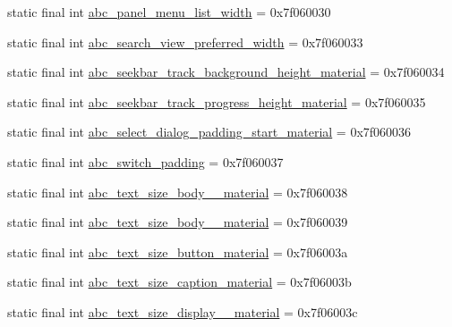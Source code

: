 \begin{DoxyCompactItemize}
\item 
static final int \mbox{\hyperlink{classcom_1_1google_1_1android_1_1gms_1_1R_1_1dimen_add7bc4ed82e03c4d01b5cb1295a62ae3}{abc\+\_\+panel\+\_\+menu\+\_\+list\+\_\+width}} = 0x7f060030
\item 
static final int \mbox{\hyperlink{classcom_1_1google_1_1android_1_1gms_1_1R_1_1dimen_acbe8579e8f0e1d5d3d8af15fb079e602}{abc\+\_\+search\+\_\+view\+\_\+preferred\+\_\+width}} = 0x7f060033
\item 
static final int \mbox{\hyperlink{classcom_1_1google_1_1android_1_1gms_1_1R_1_1dimen_a3303b3c397c279614a917fea7c881886}{abc\+\_\+seekbar\+\_\+track\+\_\+background\+\_\+height\+\_\+material}} = 0x7f060034
\item 
static final int \mbox{\hyperlink{classcom_1_1google_1_1android_1_1gms_1_1R_1_1dimen_a54b704e3923a1fb77a1e9bc92dc427e6}{abc\+\_\+seekbar\+\_\+track\+\_\+progress\+\_\+height\+\_\+material}} = 0x7f060035
\item 
static final int \mbox{\hyperlink{classcom_1_1google_1_1android_1_1gms_1_1R_1_1dimen_a3092cfc041ac0bd7f8f01a56dc8b2beb}{abc\+\_\+select\+\_\+dialog\+\_\+padding\+\_\+start\+\_\+material}} = 0x7f060036
\item 
static final int \mbox{\hyperlink{classcom_1_1google_1_1android_1_1gms_1_1R_1_1dimen_a88ea94c64aeafbb99864c2e1488ade8e}{abc\+\_\+switch\+\_\+padding}} = 0x7f060037
\item 
static final int \mbox{\hyperlink{classcom_1_1google_1_1android_1_1gms_1_1R_1_1dimen_a6a13eb33a7a24048375231adac24f8e6}{abc\+\_\+text\+\_\+size\+\_\+body\+\_\+\_\+material}} = 0x7f060038
\item 
static final int \mbox{\hyperlink{classcom_1_1google_1_1android_1_1gms_1_1R_1_1dimen_af4d6708f75b34c6219eca9dfdc187052}{abc\+\_\+text\+\_\+size\+\_\+body\+\_\+\_\+material}} = 0x7f060039
\item 
static final int \mbox{\hyperlink{classcom_1_1google_1_1android_1_1gms_1_1R_1_1dimen_acf2773ce7423cce6b5cea6005c391ccc}{abc\+\_\+text\+\_\+size\+\_\+button\+\_\+material}} = 0x7f06003a
\item 
static final int \mbox{\hyperlink{classcom_1_1google_1_1android_1_1gms_1_1R_1_1dimen_ada4d61a085f1ad09c44fa68ffdb3fe26}{abc\+\_\+text\+\_\+size\+\_\+caption\+\_\+material}} = 0x7f06003b
\item 
static final int \mbox{\hyperlink{classcom_1_1google_1_1android_1_1gms_1_1R_1_1dimen_a735427cdd5952ba0d233af4a6282796a}{abc\+\_\+text\+\_\+size\+\_\+display\+\_\+\_\+material}} = 0x7f06003c

\end{DoxyCompactItemize}
